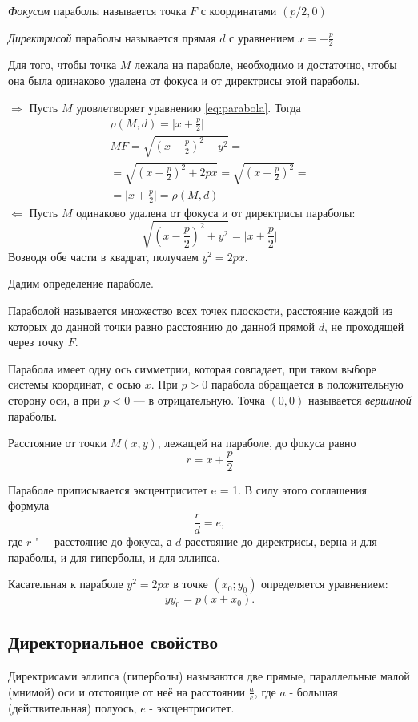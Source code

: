 \textit{Фокусом} параболы называется точка $F$ с координатами $(p / 2, 0)$

\textit{Директрисой} параболы называется прямая $d$ с уравнением $x = -\frac{p}{2}$

\begin{theorem}
  Для того, чтобы точка $M$ лежала
  на параболе, необходимо и достаточно, чтобы она была одинаково удалена от фокуса и от директрисы этой параболы.
\end{theorem}
\begin{Proof}
  $\Rightarrow$ Пусть $M$ удовлетворяет уравнению \ref{eq:parabola}. Тогда
  \begin{gather*}
    \rho (M, d) = \mathopen|x + \frac{p}{2}\mathclose| \\
    MF = \sqrt{(x - \frac{p}{2})^2 + y^2} = \\
    = \sqrt{(x - \frac{p}{2})^2 + 2px} = \sqrt{(x + \frac{p}{2})^2} =  \\
    = \mathopen|x + \frac{p}{2}\mathclose| = \rho (M, d)
  \end{gather*}
  $\Leftarrow$ Пусть $M$ одинаково удалена от фокуса и от директрисы параболы:
  $$
    \sqrt{(x - \frac{p}{2})^2 + y^2} = \mathopen|x + \frac{p}{2}\mathclose|
  $$
  Возводя обе части в квадрат, получаем $y^2 = 2px$.
\end{Proof}
Дадим определение параболе.
\begin{definition}
  Параболой называется множество всех точек плоскости, расстояние каждой из которых до данной точки равно расстоянию до данной прямой $d$, не проходящей через точку $F$.
\end{definition}
Парабола имеет одну ось симметрии, которая совпадает, при таком выборе системы координат, с осью $x$. При $p > 0$ парабола обращается в положительную сторону оси, а при $p < 0$ — в отрицательную. Точка $(0,0)$ называется \textit{вершиной} параболы.

Расстояние от
точки $M(x, y)$, лежащей на параболе, до
фокуса равно
$$
  r = x + \frac{p}{2}
$$

Параболе приписывается эксцентриситет e = 1. В силу этого соглашения формула
$$
  \frac{r}{d} = e,
$$ где $r$ "--- расстояние до фокуса, а $d$ расстояние до директрисы, верна и для параболы, и для гиперболы, и для эллипса.

Касательная к параболе $y^2 = 2px$ в точке $(x_0; y_0)$ определяется уравнением:
$$
  yy_0 = p(x + x_0).
$$

\subsection*{Директориальное свойство}
\begin{definition}
  Директрисами эллипса (гиперболы) называются две прямые, параллельные малой (мнимой) оси и отстоящие от неё на расстоянии $\frac{a}{e}$, где $a$ -
  большая (действительная) полуось, $e$ - эксцентриситет.
\end{definition}

